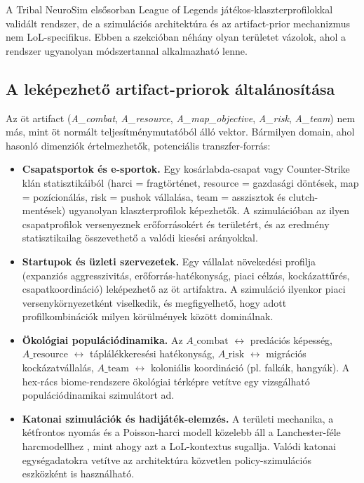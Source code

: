 A Tribal NeuroSim elsősorban League of Legends játékos-klaszterprofilokkal
validált rendszer, de a szimulációs architektúra és az artifact-prior mechanizmus
nem LoL-specifikus. Ebben a szekcióban néhány olyan területet vázolok, ahol
a rendszer ugyanolyan módszertannal alkalmazható lenne.

\subsection*{A leképezhető artifact-priorok általánosítása}

Az öt artifact (\textit{A\_combat}, \textit{A\_resource}, \textit{A\_map\_objective},
\textit{A\_risk}, \textit{A\_team}) nem más, mint öt normált teljesítménymutatóból
álló vektor. Bármilyen domain, ahol hasonló dimenziók értelmezhetők, potenciális
transzfer-forrás:

\begin{itemize}
  \item \textbf{Csapatsportok és e-sportok.} Egy kosárlabda-csapat vagy Counter-Strike
    klán statisztikáiból (harci = fragtörténet, resource = gazdasági döntések, map = pozícionálás,
    risk = pushok vállalása, team = asszisztok és clutch-mentések) ugyanolyan klaszterprofilok
    képezhetők. A szimulációban az ilyen csapatprofilok versenyeznek erőforrásokért és
    területért, és az eredmény statisztikailag összevethető a valódi kiesési arányokkal.
  \item \textbf{Startupok és üzleti szervezetek.} Egy vállalat növekedési profilja
    (expanziós aggresszivitás, erőforrás-hatékonyság, piaci célzás, kockázattűrés,
    csapatkoordináció) leképezhető az öt artifaktra. A szimuláció ilyenkor piaci
    versenykörnyezetként viselkedik, és megfigyelhető, hogy adott profilkombinációk
    milyen körülmények között dominálnak.
  \item \textbf{Ökológiai populációdinamika.} Az $A\_\text{combat}$ $\leftrightarrow$ predációs képesség,
    $A\_\text{resource}$ $\leftrightarrow$ táplálékkeresési hatékonyság, $A\_\text{risk}$ $\leftrightarrow$ migrációs kockázatvállalás,
    $A\_\text{team}$ $\leftrightarrow$ koloniális koordináció (pl. falkák, hangyák). A hex-rács biome-rendszere
    ökológiai térképre vetítve egy vizsgálható populációdinamikai szimulátort ad.
  \item \textbf{Katonai szimulációk és hadijáték-elemzés.} A területi mechanika,
    a kétfrontos nyomás és a Poisson-harci modell közelebb áll a Lanchester-féle
    harcmodellhez \cite{lanchester1916}, mint ahogy azt a LoL-kontextus sugallja.
    Valódi katonai egységadatokra vetítve az architektúra közvetlen policy-szimulációs
    eszközként is használható.
\end{itemize}

